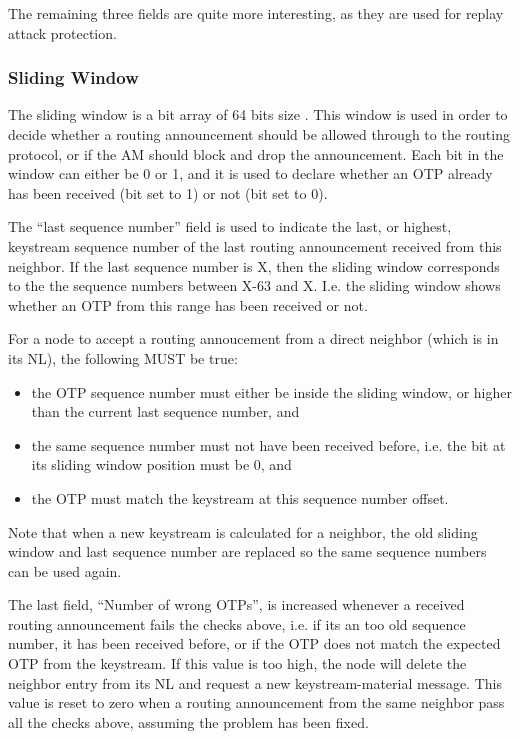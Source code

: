The remaining three fields are quite more interesting, as they are used for
replay attack protection.

\subsubsection*{Sliding Window}
The sliding window is a bit array of 64 bits size \cite{peterson2007computer}.
This window is used in order to decide whether a routing announcement should be
allowed through to the routing protocol, or if the \ac{AM} should block and
drop the announcement. Each bit in the window can either be 0 or 1, and it is
used to declare whether an \acf{OTP} already has been received (bit set to 1)
or not (bit set to 0).

The ``last sequence number'' field is used to indicate the last, or highest,
keystream sequence number of the last routing announcement received from this
neighbor. If the last sequence number is X, then the sliding window corresponds
to the the sequence numbers between X-63 and X. I.e. the sliding window shows
whether an \ac{OTP} from this range has been received or not.

For a node to accept a routing annoucement from a direct neighbor (which is in
its \ac{NL}), the following MUST be true:
\begin{itemize}
  \item the \ac{OTP} sequence number must either be inside the sliding window,
  	or higher than the current last sequence number, and
  \item the same sequence number must not have been received before, i.e. the
  	bit at its sliding window position must be 0, and
  \item the \ac{OTP} must match the keystream at this sequence number offset.
\end{itemize}
Note that when a new keystream is calculated for a neighbor, the old sliding
window and last sequence number are replaced so the same sequence numbers can be
used again.

The last field, ``Number of wrong OTPs'', is increased whenever a received
routing announcement fails the checks above, i.e. if its an too old sequence
number, it has been received before, or if the \ac{OTP} does not match the
expected \ac{OTP} from the keystream. If this value is too high, the node will
delete the neighbor entry from its \ac{NL} and request a new keystream-material
message. This value is reset to zero when a routing announcement from the same
neighbor pass all the checks above, assuming the problem has been fixed.

